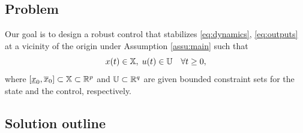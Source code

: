\documentclass[letterpaper, 10 pt, conference]{ieeeconf}  %
\begin{document}
\subsection{Problem}

Our goal is to design a robust control that stabilizes \eqref{eq:dynamics},
\eqref{eq:outputs} at a vicinity of the origin under Assumption \ref{assu:main}
such that
\begin{equation}
x(t)\in\mathbb{X},\;u(t)\in\mathbb{U}\quad\forall t\geq0,\label{eq:constraints}
\end{equation}
where $[\underline{x}_{0},\overline{x}_{0}]\subset\mathbb{X}\subset\mathbb{R}^{p}$
and $\mathbb{U}\subset\mathbb{R}^{q}$ are given bounded constraint sets for the
state and the control, respectively.

\subsection{Solution outline}
\end{document}

